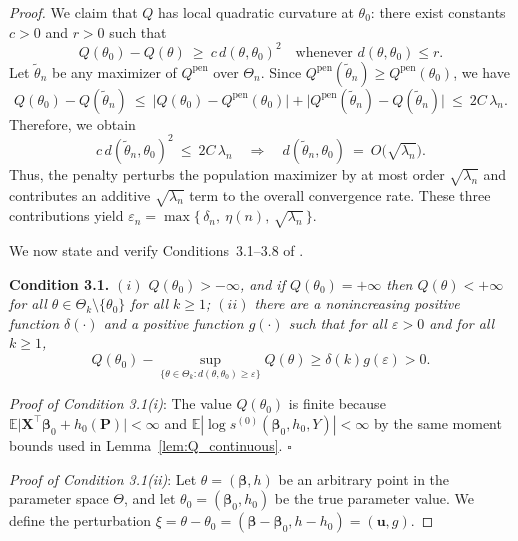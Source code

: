 \documentclass[11pt]{article}
\newcommand{\E}{\mathbb{E}}
\newenvironment{condition}[1]
  {\par\medskip\noindent\textbf{Condition #1.}\itshape}
  {\medskip}
\begin{document}
\begin{proof}
        We claim that \(Q\) has local quadratic curvature at \(\theta_0\): there exist constants
        \(c>0\) and \(r>0\) such that
        \[
        Q(\theta_0)-Q(\theta)\ \ge\ c\,d(\theta,\theta_0)^2
        \quad\text{whenever } d(\theta,\theta_0)\le r .
        \]
        Let \(\tilde\theta_n\) be any maximizer of \(Q^{\mathrm{pen}}\) over \(\Theta_n\).
        Since \(Q^{\mathrm{pen}}(\tilde\theta_n)\ge Q^{\mathrm{pen}}(\theta_0)\), we have
        \[
        Q(\theta_0)-Q(\tilde\theta_n)
        \ \le\ \bigl|Q(\theta_0)-Q^{\mathrm{pen}}(\theta_0)\bigr|
              + \bigl|Q^{\mathrm{pen}}(\tilde\theta_n)-Q(\tilde\theta_n)\bigr|
        \ \le\ 2C\,\lambda_n .
        \]
        Therefore, we obtain
        \[
        c\,d(\tilde\theta_n,\theta_0)^2 \ \le\ 2C\,\lambda_n
        \quad\Longrightarrow\quad
        d(\tilde\theta_n,\theta_0)\ =\ O\!\big(\sqrt{\lambda_n}\big).
        \]
        Thus, the penalty perturbs the population maximizer by at most order \(\sqrt{\lambda_n}\)
        and contributes an additive \(\sqrt{\lambda_n}\) term to the overall convergence rate. These three contributions yield $\varepsilon_n = \max\Big\{\,\delta_n,\ \eta(n),\, \sqrt{\lambda_n}\,\Big\}$.  
        
        We now state and verify Conditions~3.1–3.8 of \cite{chen2007large}.

		
	    \begin{condition}{3.1}\label{condition3.1} $(i)$ $Q(\theta_0) > -\infty$, and if $Q(\theta_0) = +\infty$ then $Q(\theta) < +\infty$ for all $\theta \in \Theta_k \setminus \{\theta_0\}$ for all $k \geq 1$; $(ii)$  there are a nonincreasing positive function $\delta(\cdot)$ and a positive function $g(\cdot)$ such that for all $\varepsilon > 0$ and for all $k \geq 1$,
			\[
			Q(\theta_0) - \sup_{\{\theta \in \Theta_k : d(\theta, \theta_0) \geq \varepsilon\}} Q(\theta) \geq \delta(k) g(\varepsilon) > 0.
			\]       
        \end{condition}

		\noindent \textit{Proof of Condition 3.1(i)}: The value $Q(\theta_0)$ is finite because $\E\bigl|\bm X^{\!\top}\bm \beta_0+h_0(\bm P)\bigr|<\infty$ and $\E|\log s^{(0)}(\bm \beta_0,h_0,Y)|<\infty$ by the same moment bounds used in Lemma~\ref{lem:Q_continuous}. \hfill $\square$
		
		\noindent \textit{Proof of Condition 3.1(ii)}: Let $\theta = (\bm\beta, h)$ be an arbitrary point in the parameter space $\Theta$, and let $\theta_0 = (\bm\beta_0, h_0)$ be the true parameter value. We define the perturbation $\xi = \theta - \theta_0 = (\bm\beta - \bm\beta_0, h - h_0) = (\bm u, g)$.
		

\end{proof}
\end{document}
